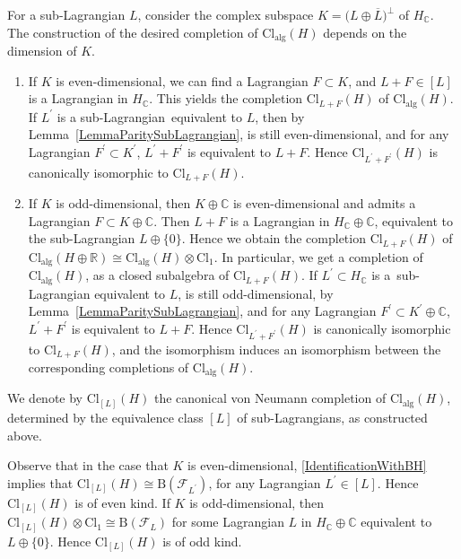 \documentclass[11pt]{article}
\numberwithin{equation}{section}
\numberwithin{equation}{section}
\newcommand{\R}{\mathbb{R}}
\newcommand{\C}{\mathbb{C}}
\newcommand{\B}{\mathrm{B}}
\newcommand{\Cl}{\mathrm{Cl}}
\begin{document}
For a sub-Lagrangian $L$, consider the complex subspace $K = \big(L \oplus \overline{L}\big)^\perp$ of $H_\C$.
The construction of the desired completion of $\Cl_{\mathrm{alg}}(H)$ depends on the dimension of $K$.
\begin{enumerate}\itemsep=0pt
\item[(i)] If $K$ is even-dimensional, we can find a Lagrangian $F \subset K$, and $L + F \in [L]$ is a Lagrangian in $H_\C$.
This yields the completion $\Cl_{L+F}(H)$ of $\Cl_{\mathrm{alg}}(H)$.
If $L^\prime$ is a sub-Lagrangian~equivalent to $L$, then by Lemma~\ref{LemmaParitySubLagrangian},  is still even-dimensional, and for any Lagrangian $F^\prime \subset K^\prime$, $L^\prime + F^\prime$ is equivalent to $L+F$.
Hence $\Cl_{L^\prime + F^\prime}(H)$ is canonically isomorphic to $\Cl_{L+F}(H)$.

\item[(ii)] If $K$ is odd-dimensional, then $K \oplus \C$ is even-dimensional and admits a Lagrangian $F \subset K \oplus \C$.
Then $L + F$ is a Lagrangian in $H_\C \oplus \C$, equivalent to the sub-Lagrangian $L \oplus \{0\}$.
Hence we obtain the completion $\Cl_{L+F}(H)$ of $\Cl_{\mathrm{alg}}(H \oplus \R) \cong \Cl_{\mathrm{alg}}(H) \otimes \Cl_1$.
In particular, we get a completion of $\Cl_{\mathrm{alg}}(H)$, as a closed subalgebra of $\Cl_{L+F}(H)$.
If $L^\prime \subset H_\C$ is a~sub-Lagrangian equivalent to $L$,  is still odd-dimensional, by Lemma~\ref{LemmaParitySubLagrangian}, and for any Lagrangian $F^\prime \subset K^\prime \oplus \C$, $L^\prime + F^\prime$ is equivalent to $L+F$.
Hence $\Cl_{L^\prime+F^\prime}(H)$ is canonically isomorphic to $\Cl_{L + F}(H)$, and the isomorphism induces an isomorphism between the corresponding completions of $\Cl_{\mathrm{alg}}(H)$.
\end{enumerate}

We denote by $\Cl_{[L]}(H)$ the canonical von Neumann completion of $\Cl_{\mathrm{alg}}(H)$, determined by the equivalence class $[L]$ of sub-Lagrangians, as constructed above.

Observe that in the case that $K$ is even-dimensional, \eqref{IdentificationWithBH} implies that $\Cl_{[L]}(H) \cong \B(\mathcal{F}_{L^\prime})$, for any Lagrangian $L^\prime \in [L]$.
Hence $\Cl_{[L]}(H)$ is of even kind.
If $K$ is odd-dimensional, then $\Cl_{[L]}(H) \otimes \Cl_1 \cong \B(\mathcal{F}_{L})$ for some Lagrangian $L$ in $H_\C \oplus \C$ equivalent to $L \oplus \{0\}$.
Hence $\Cl_{[L]}(H)$ is of odd kind.
\end{document}
